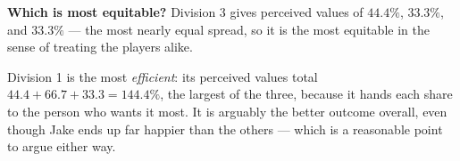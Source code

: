 \documentclass[12pt]{ximera}
\begin{document}
\begin{problem}
\begin{prompt}
\begin{solution}
\textbf{Which is most equitable?} Division 3 gives perceived values of $44.4\%$,
$33.3\%$, and $33.3\%$ --- the most nearly equal spread, so it is the most equitable in
the sense of treating the players alike.

Division 1 is the most \emph{efficient}: its perceived values total
$44.4+66.7+33.3 = 144.4\%$, the largest of the three, because it hands each share to
the person who wants it most. It is arguably the better outcome overall, even though
Jake ends up far happier than the others --- which is a reasonable point to argue
either way.
\end{solution}
\end{prompt}
\end{problem}
\end{document}
